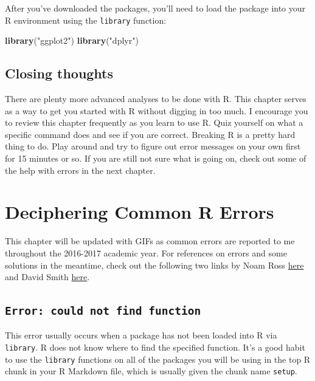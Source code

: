 \documentclass[]{tufte-book}
\newenvironment{Shaded}{\begin{snugshade}}{\end{snugshade}}
\newcommand{\KeywordTok}[1]{\textcolor[rgb]{0.13,0.29,0.53}{\textbf{{#1}}}}
\newcommand{\StringTok}[1]{\textcolor[rgb]{0.31,0.60,0.02}{{#1}}}
\newcommand{\NormalTok}[1]{{#1}}
\theoremstyle{definition}
\theoremstyle{definition}
\theoremstyle{remark}
\begin{document}
After you've downloaded the packages, you'll need to load the package
into your R environment using the \texttt{library} function:

\begin{Shaded}
\begin{Highlighting}[]
\KeywordTok{library}\NormalTok{(}\StringTok{"ggplot2"}\NormalTok{)}
\KeywordTok{library}\NormalTok{(}\StringTok{"dplyr"}\NormalTok{)}
\end{Highlighting}
\end{Shaded}

\section{Closing thoughts}\label{closing-thoughts}

There are plenty more advanced analyses to be done with R. This chapter
serves as a way to get you started with R without digging in too much. I
encourage you to review this chapter frequently as you learn to use R.
Quiz yourself on what a specific command does and see if you are
correct. Breaking R is a pretty hard thing to do. Play around and try to
figure out error messages on your own first for 15 minutes or so. If you
are still not sure what is going on, check out some of the help with
errors in the next chapter.

\chapter{Deciphering Common R Errors}\label{errors}

This chapter will be updated with GIFs as common errors are reported to
me throughout the 2016-2017 academic year. For references on errors and
some solutions in the meantime, check out the following two links by
Noam Ross
\href{https://github.com/noamross/zero-dependency-problems/blob/master/misc/stack-overflow-common-r-errors.md}{here}
and David Smith
\href{http://blog.revolutionanalytics.com/2015/03/the-most-common-r-error-messages.html}{here}.

\section{\texorpdfstring{\texttt{Error:\ could\ not\ find\ function}}{Error: could not find function}}\label{error-could-not-find-function}

This error usually occurs when a package has not been loaded into R via
\texttt{library}. R does not know where to find the specified function.
It's a good habit to use the \texttt{library} functions on all of the
packages you will be using in the top R chunk in your R Markdown file,
which is usually given the chunk name \texttt{setup}.
\end{document}
